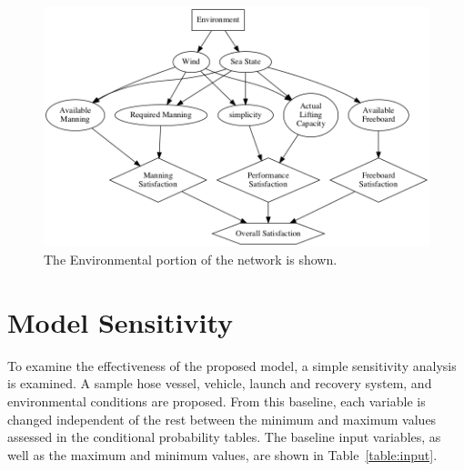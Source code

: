 \documentclass{svproc}
\begin{document}
\begin{figure}[htb]
\begin{adjustwidth}{-0.5cm}{-.5cm} 
\centering
\includegraphics[width=13.2cm]{env_tree.png}
\caption{The Environmental portion of the network is shown.}
\label{fig:env_tree}
\end{adjustwidth} 
\end{figure}

\FloatBarrier

\section{Model Sensitivity}

To examine the effectiveness of the proposed model, a simple sensitivity analysis is examined. A sample hose vessel, vehicle, launch and recovery system, and environmental conditions are proposed. From this baseline, each variable is changed independent of the rest between the  minimum and maximum values assessed in the conditional probability tables. The baseline input variables, as well as the maximum and minimum values, are shown in Table~\ref{table:input}. 
\end{document}
